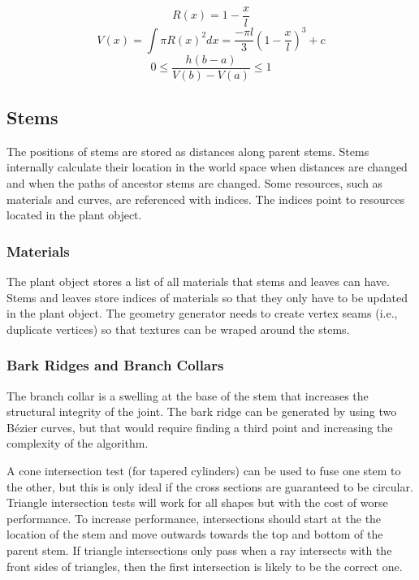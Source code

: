 \documentclass[10pt]{article}
\begin{document}
\[ R(x) = 1 - \frac{x}{l} \]
\[ V(x) = \int \pi R(x)^2 dx = \frac{-\pi l}{3} \left( 1 - \frac{x}{l} \right)^3 + c \]
\[ 0 \leq \frac{h(b-a)}{V(b)-V(a)} \leq 1 \]

\subsection{Stems}
The positions of stems are stored as distances along parent stems. Stems internally calculate their location in the world space when distances are changed and when the paths of ancestor stems are changed. Some resources, such as materials and curves, are referenced with indices. The indices point to resources located in the plant object.

\subsubsection{Materials}
The plant object stores a list of all materials that stems and leaves can have. Stems and leaves store indices of materials so that they only have to be updated in the plant object. The geometry generator needs to create vertex seams (i.e., duplicate vertices) so that textures can be wraped around the stems.

\subsubsection{Bark Ridges and Branch Collars}
The branch collar is a swelling at the base of the stem that increases the structural integrity of the joint. The bark ridge can be generated by using two B\'{e}zier curves, but that would require finding a third point and increasing the complexity of the algorithm.

\setlength{\parindent}{1.5em}
A cone intersection test (for tapered cylinders) can be used to fuse one stem to the other, but this is only ideal if the cross sections are guaranteed to be circular. Triangle intersection tests will work for all shapes but with the cost of worse performance. To increase performance, intersections should start at the the location of the stem and move outwards towards the top and bottom of the parent stem. If triangle intersections only pass when a ray intersects with the front sides of triangles, then the first intersection is likely to be the correct one.
\end{document}
